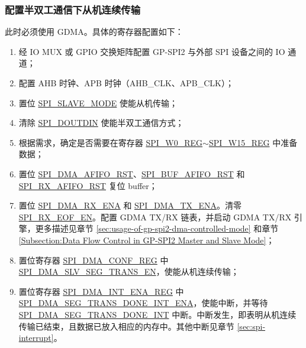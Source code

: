 \documentclass[main\_\_CN.tex]{subfiles}
\begin{document}
\subsubsection{配置半双工通信下从机连续传输}\label{sec:gp-spi2-slave-hd-seg-trans}

此时必须使用 GDMA。具体的寄存器配置如下：

\begin{enumerate}
   \item 经 IO MUX 或 GPIO 交换矩阵配置 GP-SPI2 与外部 SPI 设备之间的 IO 通道；

   \item 配置 AHB 时钟、APB 时钟（AHB\_CLK、APB\_CLK）；

    \item 置位 \hyperref[fielddesc:SPISLAVEMODE]{SPI\_SLAVE\_MODE} 使能从机传输；

    \item 清除 \hyperref[fielddesc:SPIDOUTDIN]{SPI\_DOUTDIN} 使能半双工通信方式；

    \item 根据需求，确定是否需要在寄存器 \hyperref[regdesc:SPIW0REG]{SPI\_W0\_REG}$\sim$\hyperref[regdesc:SPIW15REG]{SPI\_W15\_REG} 中准备数据；

    \item 置位 \hyperref[fielddesc:SPIDMAAFIFORST]{SPI\_DMA\_AFIFO\_RST}、\hyperref[fielddesc:SPIBUFAFIFORST]{SPI\_BUF\_AFIFO\_RST} 和 \hyperref[fielddesc:SPIRXAFIFORST]{SPI\_RX\_AFIFO\_RST} 复位 buffer；

    \item 置位 \hyperref[fielddesc:SPIDMARXENA]{SPI\_DMA\_RX\_ENA} 和 \hyperref[fielddesc:SPIDMATXENA]{SPI\_DMA\_TX\_ENA}。清零 \hyperref[fielddesc:SPIRXEOFEN]{SPI\_RX\_EOF\_EN}。配置 GDMA TX/RX 链表，并启动 GDMA TX/RX 引擎，更多描述见章节 \ref{sec:usage-of-gp-spi2-dma-controlled-mode} 和章节 \ref{Subsection:Data Flow Control in GP-SPI2 Master and Slave Mode}；

    \item 置位寄存器 \hyperref[regdesc:SPIDMACONFREG]{SPI\_DMA\_CONF\_REG} 中 \hyperref[fielddesc:SPIDMASLVSEGTRANSEN]{SPI\_DMA\_SLV\_SEG\_TRANS\_EN}，使能从机连续传输；

    \item 置位寄存器 \hyperref[regdesc:SPIDMAINTENAREG]{SPI\_DMA\_INT\_ENA\_REG} 中 \hyperref[fielddesc:SPIDMASEGTRANSDONEINTENA]{SPI\_DMA\_SEG\_TRANS\_DONE\_INT\_ENA}，使能中断，并等待 \hyperref[int:SPIDMASEGTRANSDONEINT]{SPI\_DMA\_SEG\_TRANS\_DONE\_INT} 中断。中断发生，即表明从机连续传输已结束，且数据已放入相应的内存中。其他中断见章节 \ref{sec:spi-interrupt}。
\end{enumerate}
\end{document}
